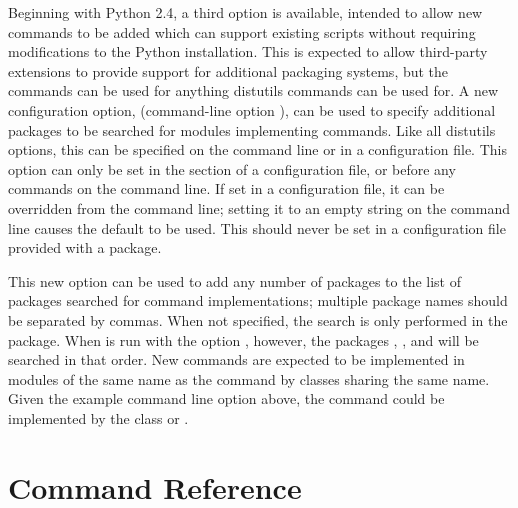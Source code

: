 \documentclass{manual}
\begin{document}
Beginning with Python 2.4, a third option is available, intended to
allow new commands to be added which can support existing
 scripts without requiring modifications to the Python
installation.  This is expected to allow third-party extensions to
provide support for additional packaging systems, but the commands can
be used for anything distutils commands can be used for.  A new
configuration option,  (command-line option
), can be used to specify additional
packages to be searched for modules implementing commands.  Like all
distutils options, this can be specified on the command line or in a
configuration file.  This option can only be set in the
\code{[global]} section of a configuration file, or before any
commands on the command line.  If set in a configuration file, it can
be overridden from the command line; setting it to an empty string on
the command line causes the default to be used.  This should never be
set in a configuration file provided with a package.

This new option can be used to add any number of packages to the list
of packages searched for command implementations; multiple package
names should be separated by commas.  When not specified, the search
is only performed in the  package.  When
 is run with the option
 ,
however, the packages , ,
and  will be searched in that order.  New commands
are expected to be implemented in modules of the same name as the
command by classes sharing the same name.  Given the example command
line option above, the command  could be
implemented by the class 
or .


\chapter{Command Reference}
\label{reference}



\end{document}

